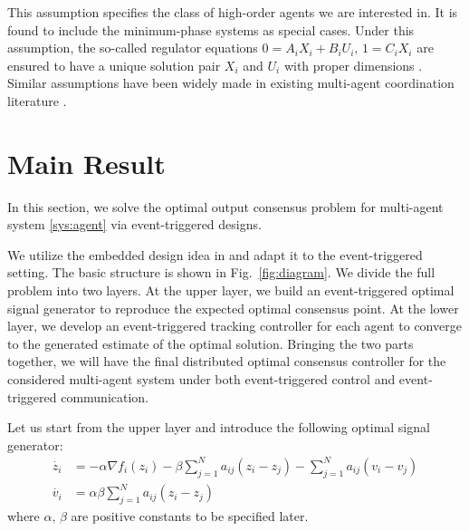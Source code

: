\documentclass[sort&compress]{IEEEtran}
\begin{document}
This assumption specifies the class of high-order agents we are interested in. It is found to include the minimum-phase systems as special cases. Under this assumption, the so-called regulator equations $0=A_i X_i +B_i U_i,\, 1 =C_i X_i$ are ensured to have a unique solution pair $X_i$ and $U_i$ with proper dimensions \cite{huang2004nonlinear}.  Similar assumptions have been widely made in existing multi-agent coordination literature \cite{tang2019optimal, li2019distributed,  an2021distributed}.



\section{Main Result}\label{sec:main}

In this section, we solve the optimal output consensus problem for multi-agent system \eqref{sys:agent} via event-triggered designs. 

We utilize the embedded design idea in \cite{tang2019optimal,tang2021optimal} and adapt it to the event-triggered setting. The basic structure is shown in Fig.~\ref{fig:diagram}. We divide the full problem into two layers. At the upper layer, we build an event-triggered optimal signal generator to reproduce the expected optimal consensus point. At the lower layer, we develop  an event-triggered tracking controller for each agent to converge to the generated estimate of the optimal solution. Bringing the two parts together, we will have the final distributed optimal consensus controller for the considered multi-agent system under both event-triggered control and event-triggered communication.  


Let us start from the upper layer and introduce the following optimal signal generator: %
\begin{align}\label{sys:generator}
		\dot{z_i}&= -\alpha \nabla f_i(z_i)-\beta \sum_{j=1}^{N}a_{ij}(z_i- z_j)-\sum_{j=1}^{N} a_{ij}(v_i-v_j) \nonumber \\
		\dot{v_i} &=\alpha \beta \sum_{j=1}^{N}a_{ij}(z_i-z_j)
\end{align}
where $\alpha,\,\beta$ are positive constants to be specified later. 
\end{document}
